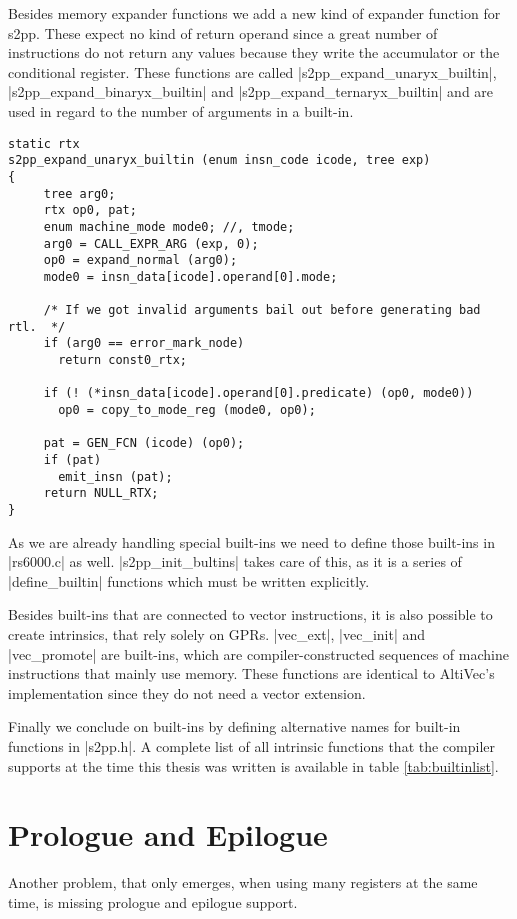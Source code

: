 Besides memory expander functions we add a new kind of expander function for s2pp.
These expect no kind of return operand since a great number of instructions do not return any values because they write the accumulator or the conditional register.
These functions are called |s2pp_expand_unaryx_builtin|, |s2pp_expand_binaryx_builtin| and |s2pp_expand_ternaryx_builtin| and are used in regard to the number of arguments in a built-in.
\begin{lstlisting}
static rtx
s2pp_expand_unaryx_builtin (enum insn_code icode, tree exp)
{
     tree arg0;
     rtx op0, pat;
     enum machine_mode mode0; //, tmode;
     arg0 = CALL_EXPR_ARG (exp, 0);
     op0 = expand_normal (arg0);
     mode0 = insn_data[icode].operand[0].mode;

     /* If we got invalid arguments bail out before generating bad rtl.  */
     if (arg0 == error_mark_node)
       return const0_rtx;

     if (! (*insn_data[icode].operand[0].predicate) (op0, mode0))
       op0 = copy_to_mode_reg (mode0, op0);

     pat = GEN_FCN (icode) (op0);
     if (pat)
       emit_insn (pat);
     return NULL_RTX;
}
\end{lstlisting}

As we are already handling special built-ins we need to define those built-ins in |rs6000.c| as well.
|s2pp_init_bultins| takes care of this, as it is a series of |define_builtin| functions which must be written explicitly.

Besides built-ins that are connected to vector instructions, it is also possible to create intrinsics, that rely solely on GPRs.
|vec_ext|, |vec_init| and |vec_promote| are built-ins, which are compiler-constructed sequences of machine instructions that mainly use memory.
These functions are identical to AltiVec's implementation since they do not need a vector extension.

Finally we conclude on built-ins by defining alternative names for built-in functions in |s2pp.h|.
A complete list of all intrinsic functions that the compiler supports at the time this thesis was written is available in table \ref{tab:builtinlist}.

\section{Prologue and Epilogue}
Another problem, that only emerges, when using many registers at the same time, is missing prologue and epilogue support.

